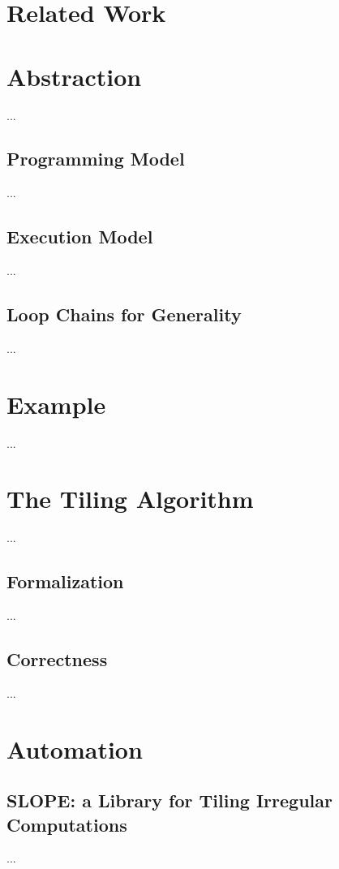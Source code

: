 \section{Related Work}
\label{sec:tiling:relatedwork}

\section{Abstraction}
\label{sec:tiling:lc}
...

\subsection{Programming Model}
...

\subsection{Execution Model}
...

\subsection{Loop Chains for Generality}
...

\section{Example}
...

\section{The Tiling Algorithm}
...

\subsection{Formalization}
...

\subsection{Correctness}
...


\section{Automation}

\subsection{SLOPE: a Library for Tiling Irregular Computations}
...

